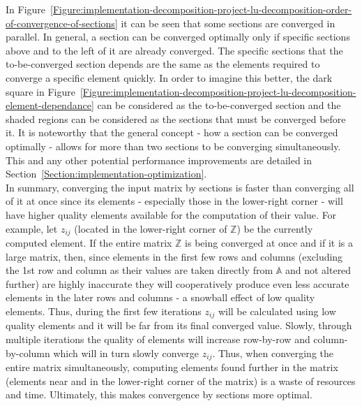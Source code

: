 In Figure~\ref{Figure:implementation-decomposition-project-lu-decomposition-order-of-convergence-of-sections} it can be seen that some sections are converged in parallel. In general, a section can be converged optimally only if specific sections above and to the left of it are already converged. The specific sections that the to-be-converged section depends are the same as the elements required to converge a specific element quickly. In order to imagine this better, the dark square in Figure~\ref{Figure:implementation-decomposition-project-lu-decomposition-element-dependance} can be considered as the to-be-converged section and the shaded regions can be considered as the sections that must be converged before it. It is noteworthy that the general concept - how a section can be converged optimally - allows for more than two sections to be converging simultaneously. This and any other potential performance improvements are detailed in Section~\ref{Section:implementation-optimization}. \\
In summary, converging the input matrix by sections is faster than converging all of it at once since its elements - especially those in the lower-right corner - will have higher quality elements available for the computation of their value. For example, let $ z_{ij} $ (located in the lower-right corner of $ \mathbb{Z} $) be the currently computed element. If the entire matrix $ \mathbb{Z} $ is being converged at once and if it is a large matrix, then, since elements in the first few rows and columns (excluding the 1st row and column as their values are taken directly from $ \mathbb{A} $ and not altered further) are highly inaccurate they will cooperatively produce even less accurate elements in the later rows and columns - a snowball effect of low quality elements. Thus, during the first few iterations $ z_{ij} $ will be calculated using low quality elements and it will be far from its final converged value. Slowly, through multiple iterations the quality of elements will increase row-by-row and column-by-column which will in turn slowly converge $ z_{ij} $. Thus, when converging the entire matrix simultaneously, computing elements found further in the matrix (elements near and in the lower-right corner of the matrix) is a waste of resources and time. Ultimately, this makes convergence by sections more optimal.

